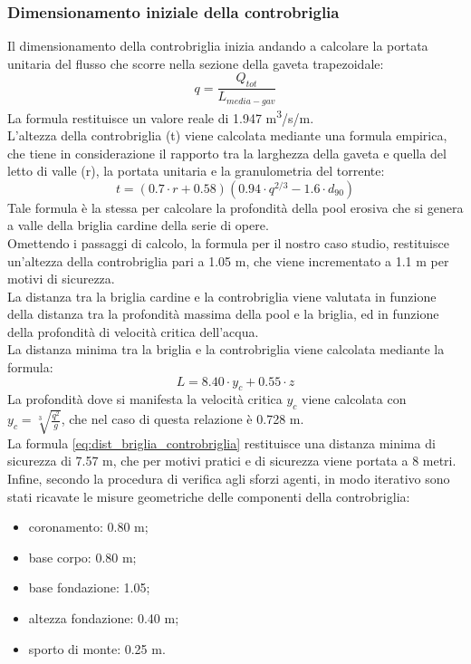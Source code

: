 \subsubsection{Dimensionamento iniziale della controbriglia}
Il dimensionamento della controbriglia inizia andando a calcolare la portata unitaria del flusso che scorre nella sezione della gaveta trapezoidale:
\begin{equation}
    q = \frac{Q_{tot}}{L_{media-gav}}
\end{equation}
La formula restituisce un valore reale di 1.947 \unit{m^3/s/m}.\\
L'altezza della controbriglia (t) viene calcolata mediante una formula empirica, che tiene in considerazione il rapporto tra la larghezza della gaveta e quella del letto di valle (r), la portata unitaria e la granulometria del torrente:
\begin{equation}
    t= (0.7 \cdot r+0.58)(0.94 \cdot q^{2/3} - 1.6 \cdot d_{90})
\end{equation}
Tale formula è la stessa per calcolare la profondità della pool erosiva che si genera a valle della briglia cardine della serie di opere.\\
Omettendo i passaggi di calcolo, la formula per il nostro caso studio, restituisce un'altezza della controbriglia pari a 1.05 m, che viene incrementato a 1.1 m per motivi di sicurezza.\\
La distanza tra la briglia cardine e la controbriglia viene valutata in funzione della distanza tra la profondità massima della pool e la briglia, ed in funzione della profondità di velocità critica dell'acqua.\\
La distanza minima tra la briglia e la controbriglia viene calcolata mediante la formula:
\begin{equation}
    L= 8.40 \cdot y_c + 0.55 \cdot z
    \label{eq:dist_briglia_controbriglia}
\end{equation}
La profondità dove si manifesta la velocità critica $y_c$ viene calcolata con $y_c = \sqrt[3]{\frac{q^2}{g}}$, che nel caso di questa relazione è 0.728 m.\\
La formula \eqref{eq:dist_briglia_controbriglia} restituisce una distanza minima di sicurezza di 7.57 m, che per motivi pratici e di sicurezza viene portata a 8 metri.\\
Infine, secondo la procedura di verifica agli sforzi agenti, in modo iterativo sono stati ricavate le misure geometriche delle componenti della controbriglia:
\begin{itemize}
    \item coronamento: 0.80 m;
    \item base corpo: 0.80 m;
    \item base fondazione: 1.05;
    \item altezza fondazione: 0.40 m;
    \item sporto di monte: 0.25 m.
\end{itemize}